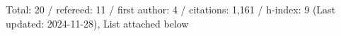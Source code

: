 Total: 20 / refereed: 11 / first author: 4 / citations: 1,161 / h-index: 9 (Last updated: 2024-11-28), List attached below